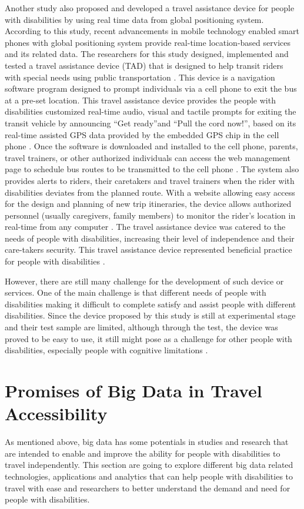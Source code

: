 Another study also proposed and developed a travel assistance device for people with 
disabilities by using real time data from global positioning system. According to 
this study, recent advancements in mobile technology enabled smart phones with global 
positioning system provide real-time location-based services and its related data.
The researchers for this study designed, implemented and tested a travel assistance device (TAD) 
that is designed to help transit riders with special needs using public transportation
\cite{Barbeau}. This device is a navigation software program designed to prompt 
individuals via a cell phone to exit the bus at a pre-set location. 
This travel assistance device provides the people with disabilities 
customized real-time audio, visual and tactile prompts for exiting the transit vehicle 
by announcing ``Get ready''and ``Pull the cord now!'', based on  its real-time assisted 
GPS data provided by the embedded GPS chip in the cell phone \cite{Barbeau}.  
Once the software is downloaded and installed to the cell phone,
parents, travel trainers, or other authorized individuals can access the web management
page to schedule bus routes to be transmitted to the cell phone \cite{Barbeau}.  The system also 
provides alerts to riders, their caretakers and travel trainers when the rider with 
disabilities deviates from the planned route. With a website allowing easy access 
for the design and planning of new trip itineraries, the device allows authorized 
personnel (usually caregivers, family members) to monitor the rider’s location 
in real-time from any computer \cite{Barbeau}. The travel assistance device was 
catered to the needs of people with disabilities, increasing their level of 
independence and their care-takers security. This travel assistance device 
represented beneficial practice for people with disabilities \cite{Barbeau}.

However, there are still many challenge for the development of such device or services. 
One of the main challenge is that different needs of people with disabilities
making it difficult to complete satisfy and assist people with different disabilities. 
Since the device proposed by this study is still at experimental stage and their 
test sample are limited, although through the test, the device was proved to be 
easy to use, it still might pose as a challenge for other people with disabilities, 
especially people with cognitive limitations \cite{Barbeau}. 


\section{Promises of Big Data in Travel Accessibility}
As mentioned above, big data has some potentials in studies and research that are intended 
to enable and improve the ability for people with disabilities to travel independently. 
This section are going to explore different big data related technologies, applications and 
analytics that can help people with disabilities to travel with ease and researchers to 
better understand the demand and need for people with disabilities.
